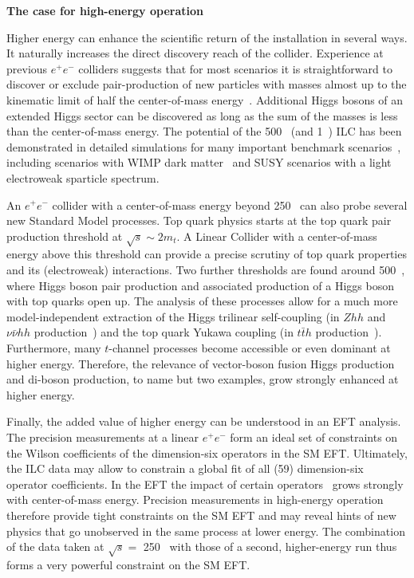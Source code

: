 {\bf The case for high-energy operation}

Higher energy can enhance the scientific return of the installation in several
ways. It naturally increases the direct discovery reach of the collider. Experience at
previous $e^+e^-$ colliders suggests that for most scenarios it is straightforward to
discover or exclude pair-production of new particles with masses almost up to the
kinematic limit of half the center-of-mass energy~\cite{Fujii:2017ekh}. Additional
Higgs bosons of an extended Higgs sector can be discovered as long as the sum of
the masses is less than the center-of-mass energy. The potential
of the 500~\GeV{} (and 1~\TeV{}) ILC has been demonstrated in detailed simulations
for many important benchmark scenarios~\cite{Fujii:2015jha,Baer:2013cma}, including
scenarios with WIMP dark matter~\cite{Bartels:2012ex} and SUSY scenarios with
a light electroweak sparticle spectrum\cite{Berggren:2013vfa}.

An $e^+e^-$ collider with a center-of-mass energy beyond 250~\GeV{} can also
probe several new Standard Model processes.
Top quark physics starts at the top quark pair production threshold at
$\sqrt{s}\sim 2 m_t$. A Linear Collider with a center-of-mass energy
above this threshold can provide a precise scrutiny of top quark
properties and its (electroweak) interactions.
Two further thresholds are found around 500~\GeV, where Higgs boson pair production
and associated production of a Higgs boson with top quarks open up.
The analysis of these processes allow for a much more model-independent
extraction of the Higgs trilinear self-coupling (in $Zhh$ and $\nu \bar{\nu}hh$
production~\cite{Barklow:2017awn}) and the top quark Yukawa
coupling (in $t\bar{t}h$ production~\cite{Yonamine:2011jg}). 
Furthermore, many $t$-channel processes become accessible or even dominant
at higher energy. Therefore, the relevance of vector-boson
fusion Higgs production and di-boson production, to name but two examples,
grow strongly enhanced at higher energy.

Finally, the added value of higher energy can be understood in an EFT analysis. The
precision measurements at a linear $e^+e^-$ form an ideal set of constraints
on the Wilson coefficients of the dimension-six operators in the SM EFT. Ultimately,
the ILC data may allow to constrain a global fit of all (59) dimension-six operator
coefficients. In the EFT the impact of certain operators~\cite{Durieux:2018tev,Barklow:2017suo}
grows strongly with center-of-mass energy. Precision measurements in high-energy operation
therefore provide tight constraints on the SM EFT and may reveal hints of new physics
that go unobserved in the same process at lower energy.
The combination of the data taken at $\sqrt{s}=$ 250~\GeV{} with those of a second,
higher-energy run thus forms a very powerful constraint on the SM EFT.

